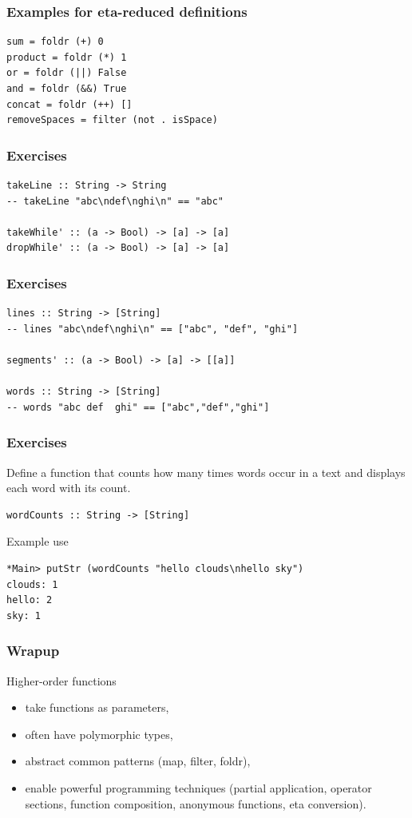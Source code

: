 \documentclass{beamer}
\begin{document}
\begin{frame}[fragile]
  \frametitle{Examples for eta-reduced definitions}
\begin{verbatim}
sum = foldr (+) 0
product = foldr (*) 1
or = foldr (||) False
and = foldr (&&) True
concat = foldr (++) []
removeSpaces = filter (not . isSpace)
\end{verbatim}
\end{frame}
\begin{frame}[fragile]
  \frametitle{Exercises}
\begin{verbatim}
takeLine :: String -> String
-- takeLine "abc\ndef\nghi\n" == "abc"

takeWhile' :: (a -> Bool) -> [a] -> [a]
dropWhile' :: (a -> Bool) -> [a] -> [a]
\end{verbatim}
\end{frame}
\begin{frame}[fragile]
  \frametitle{Exercises}
\begin{verbatim}
lines :: String -> [String]
-- lines "abc\ndef\nghi\n" == ["abc", "def", "ghi"]

segments' :: (a -> Bool) -> [a] -> [[a]]

words :: String -> [String]
-- words "abc def  ghi" == ["abc","def","ghi"]
\end{verbatim}
\end{frame}
\begin{frame}[fragile]
  \frametitle{Exercises}
  Define a function that counts how many times words occur in a text and displays each word with its count.
\begin{verbatim}
wordCounts :: String -> [String]
\end{verbatim}
  Example use
\begin{verbatim}
*Main> putStr (wordCounts "hello clouds\nhello sky")
clouds: 1
hello: 2
sky: 1
\end{verbatim}
\end{frame}
\begin{frame}
  \frametitle{Wrapup}
  \begin{alertblock}{Higher-order functions}
  \begin{itemize}
  \item take functions as parameters,
  \item often have polymorphic types,
  \item abstract common patterns (map, filter, foldr),
  \item enable powerful programming techniques (partial application, operator sections, function composition, anonymous functions, eta conversion).
  \end{itemize}
  \end{alertblock}
\end{frame}

\end{document}
